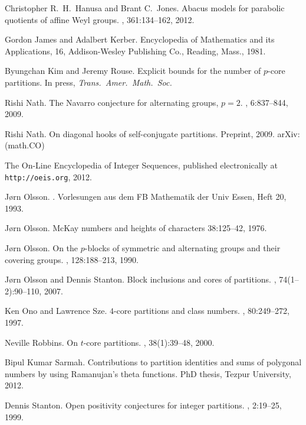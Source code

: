 \documentclass[12pt,leqno]{amsart}
\numberwithin{equation}{section}
\theoremstyle{definition}
\begin{document}
\begin{thebibliography}{1}
Christopher R.\ H.\ Hanusa and Brant C.\ Jones.
\newblock Abacus models for parabolic quotients of affine Weyl groups.
, 361:134--162, 2012.

Gordon James and Adalbert Kerber.
\newblock Encyclopedia of Mathematics and its Applications, 16, 
\newblock Addison-Wesley Publishing Co., Reading, Mass., 1981.

Byungchan Kim and Jeremy Rouse.
\newblock Explicit bounds for the number of $p$-core partitions.
\newblock In press, {\em Trans.\ Amer.\ Math.\ Soc.}

Rishi Nath. 
\newblock The Navarro conjecture for alternating groups, $p=2$.
, 6:837--844, 2009.

Rishi Nath.
\newblock On diagonal hooks of self-conjugate partitions.
\newblock Preprint, 2009. arXiv: (math.CO)

The On-Line Encyclopedia of Integer Sequences, published electronically at {\tt http://oeis.org}, 2012. 

J\o rn Olsson.
.
\newblock Vorlesungen aus dem FB Mathematik der Univ Essen, Heft 20, 1993.

J\o rn Olsson.
\newblock Mc{K}ay numbers and heights of characters
 38:125--42, 1976.

J\o rn Olsson.
\newblock On the {$p$}-blocks of symmetric and alternating groups and their covering groups.
, 128:188--213, 1990.

J\o rn Olsson and Dennis Stanton.
\newblock Block inclusions and cores of partitions.
, 74(1--2):90--110, 2007.

Ken Ono and Lawrence Sze.
\newblock $4$-core partitions and class numbers.
, 80:249--272, 1997.

Neville Robbins.
\newblock On $t$-core partitions.
, 38(1):39--48, 2000. 

Bipul Kumar Sarmah.  
\newblock Contributions to partition identities and sums of polygonal numbers by using Ramanujan's theta functions.
\newblock PhD thesis, Tezpur University, 2012.

Dennis Stanton. 
\newblock Open positivity conjectures for integer partitions.
, 2:19--25, 1999.

\end{thebibliography}
\end{document}
